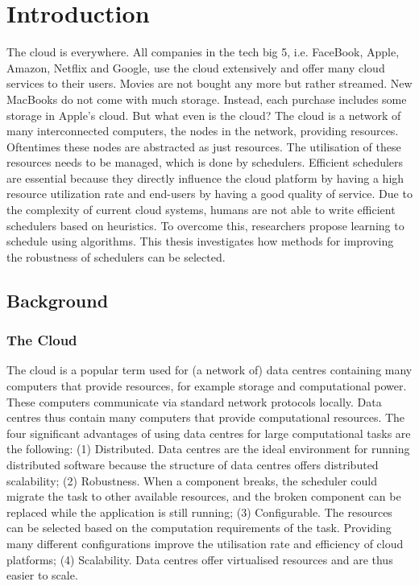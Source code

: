\chapter{Introduction}\label{sec:intro}


The cloud is everywhere. All companies in the tech big 5, i.e. FaceBook,
Apple, Amazon, Netflix and Google, use the cloud extensively and offer many
cloud services to their users. Movies are not bought any more but rather
streamed. New MacBooks do not come with much storage. Instead, each purchase
includes some storage in Apple's cloud. But what even is the cloud? The cloud
is a network of many interconnected computers, the nodes in the network,
providing resources. Oftentimes these nodes are abstracted as just resources.
The utilisation of these resources needs to be managed, which is done by
schedulers. Efficient schedulers are essential because they directly
influence the cloud platform by having a high resource utilization rate and
end-users by having a good quality of service. Due to the complexity of
current cloud systems, humans are not able to write efficient schedulers based
on heuristics. To overcome this, researchers propose learning to schedule using
\rl algorithms. This thesis investigates how methods for improving the
robustness of \rl schedulers can be selected.


\section{Background}
\subsection{The Cloud}\label{sec:cloud}

The cloud is a popular term used for (a network of) data centres containing
many computers that provide resources, for example storage and computational
power. These computers communicate via standard network protocols locally.
Data centres thus contain many computers that provide computational resources.
The four significant advantages of using data centres for large computational
tasks are the following: (1) Distributed. Data centres are the ideal
environment for running distributed software because the structure of data
centres offers distributed scalability; (2) Robustness. When a component
breaks, the scheduler could migrate the task to other available resources, and
the broken component can be replaced while the application is still running;
(3) Configurable. The resources can be selected based on the computation
requirements of the task. Providing many different configurations improve the
utilisation rate and efficiency of cloud platforms; (4) Scalability. Data
centres offer virtualised resources and are thus easier to scale.

